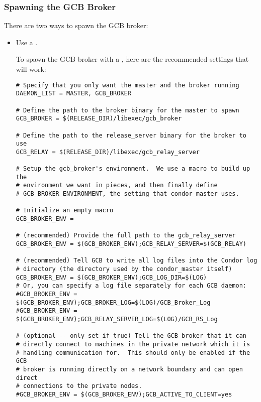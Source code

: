 \subsubsection{\label{sec:GCB-broker-spawn}
Spawning the GCB Broker}

There are two ways to spawn the GCB broker:

\begin{itemize}
\item Use a .

To spawn the GCB broker with a , here are 
the recommended  settings that will work:

\footnotesize
\begin{verbatim}
# Specify that you only want the master and the broker running
DAEMON_LIST = MASTER, GCB_BROKER

# Define the path to the broker binary for the master to spawn
GCB_BROKER = $(RELEASE_DIR)/libexec/gcb_broker

# Define the path to the release_server binary for the broker to use 
GCB_RELAY = $(RELEASE_DIR)/libexec/gcb_relay_server

# Setup the gcb_broker's environment.  We use a macro to build up the
# environment we want in pieces, and then finally define
# GCB_BROKER_ENVIRONMENT, the setting that condor_master uses.

# Initialize an empty macro
GCB_BROKER_ENV =

# (recommended) Provide the full path to the gcb_relay_server
GCB_BROKER_ENV = $(GCB_BROKER_ENV);GCB_RELAY_SERVER=$(GCB_RELAY)

# (recommended) Tell GCB to write all log files into the Condor log
# directory (the directory used by the condor_master itself)
GCB_BROKER_ENV = $(GCB_BROKER_ENV);GCB_LOG_DIR=$(LOG)
# Or, you can specify a log file separately for each GCB daemon:
#GCB_BROKER_ENV = $(GCB_BROKER_ENV);GCB_BROKER_LOG=$(LOG)/GCB_Broker_Log
#GCB_BROKER_ENV = $(GCB_BROKER_ENV);GCB_RELAY_SERVER_LOG=$(LOG)/GCB_RS_Log

# (optional -- only set if true) Tell the GCB broker that it can
# directly connect to machines in the private network which it is
# handling communication for.  This should only be enabled if the GCB
# broker is running directly on a network boundary and can open direct
# connections to the private nodes.
#GCB_BROKER_ENV = $(GCB_BROKER_ENV);GCB_ACTIVE_TO_CLIENT=yes


\end{verbatim}
\end{itemize}
